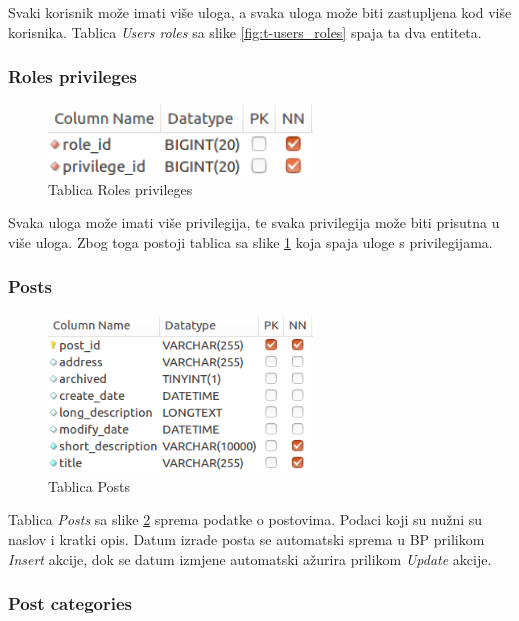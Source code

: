 \documentclass[zavrsni, numeric]{fer}
\begin{document}
Svaki korisnik može imati više uloga, a svaka uloga može biti zastupljena kod više korisnika. Tablica \textit{Users roles} sa slike \ref{fig:t-users_roles} spaja ta dva entiteta.

\subsubsection{Roles privileges}

\begin{figure}[H]
	\centering
	\includegraphics[width=7cm]{slike/t-roles_privileges.png}
	\caption{Tablica Roles privileges}
	\label{fig:t-roles_privileges}
\end{figure}

Svaka uloga može imati više privilegija, te svaka privilegija može biti prisutna u više uloga. Zbog toga postoji tablica sa slike \ref{fig:t-roles_privileges} koja spaja uloge s privilegijama.

\subsubsection{Posts}

\begin{figure}[H]
	\centering
	\includegraphics[width=7cm]{slike/t-posts.png}
	\caption{Tablica Posts}
	\label{fig:t-posts}
\end{figure}

Tablica \textit{Posts} sa slike \ref{fig:t-posts} sprema podatke o postovima. Podaci koji su nužni su naslov i kratki opis. Datum izrade posta se automatski sprema u BP prilikom \textit{Insert} akcije, dok se datum izmjene automatski ažurira prilikom \textit{Update} akcije.

\subsubsection{Post categories}
\end{document}
